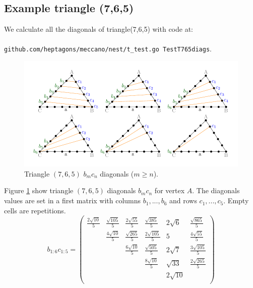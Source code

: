\documentclass[11pt]{article}
\begin{document}
\newcommand\five{\colorbox{green}{$5$}}

\subsection{Example triangle (7,6,5)}
We calculate all the diagonals of triangle(7,6,5) with code at:
\\\\
\texttt{github.com/heptagons/meccano/nest/t\_test.go TestT765diags}.

\begin{figure}[htp]
\centering
\includegraphics[scale=1]{t765bc}
\caption{Triangle $(7,6,5)$ $b_mc_n$ diagonals ($m \ge n$).}
\label{t765bc}
\end{figure}
Figure \ref{t765bc} show triangle $(7,6,5)$ diagonals $b_mc_n$ for vertex $A$.
The diagonals values are set in a first matrix with columns $b_1,...,b_6$ and rows $c_1,...,c_5$. Empty cells are repetitions.
\begin{equation}\label{eq:appendrow}
b_{1:6}c_{1:5} = \left(\begin{array}{cccccc}
\frac{2\sqrt{10}}{5} & \frac{\sqrt{105}}{5} & \frac{2\sqrt{55}}{5} & \frac{\sqrt{385}}{5} & 2\sqrt{6} & \frac{\sqrt{865}}{5} \\
& \frac{4\sqrt{10}}{5} & \frac{\sqrt{265}}{5} & \frac{2\sqrt{105}}{5} & 5 & \frac{4\sqrt{55}}{5} \\
& & \frac{6\sqrt{10}}{5} & \frac{\sqrt{505}}{5} & 2\sqrt{7} & \frac{3\sqrt{105}}{5} \\
& & & \frac{8\sqrt{10}}{5} & \sqrt{33} & \frac{2\sqrt{265}}{5} \\
& & & & 2\sqrt{10} & \\
\end{array}\right)
\end{equation}
\end{document}
